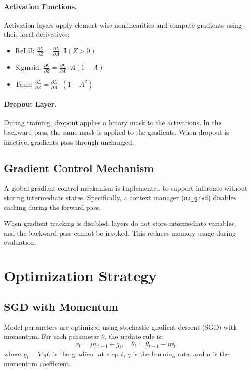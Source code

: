 \documentclass[11pt]{article}
\begin{document}
\paragraph{Activation Functions.}
Activation layers apply element-wise nonlinearities and compute gradients using their local derivatives:
\begin{itemize}
    \item ReLU: $\frac{\partial L}{\partial Z} = \frac{\partial L}{\partial A} \cdot \mathbf{I}(Z > 0)$
    \item Sigmoid: $\frac{\partial L}{\partial Z} = \frac{\partial L}{\partial A} \cdot A(1 - A)$
    \item Tanh: $\frac{\partial L}{\partial Z} = \frac{\partial L}{\partial A} \cdot (1 - A^2)$
\end{itemize}

\paragraph{Dropout Layer.}
During training, dropout applies a binary mask to the activations. In the backward pass, the same mask is applied to the gradients. When dropout is inactive, gradients pass through unchanged.

\subsection{Gradient Control Mechanism}

A global gradient control mechanism is implemented to support inference without storing intermediate states. Specifically, a context manager (\texttt{no\_grad}) disables caching during the forward pass.

When gradient tracking is disabled, layers do not store intermediate variables, and the backward pass cannot be invoked. This reduces memory usage during evaluation.

\section{Optimization Strategy}

\subsection{SGD with Momentum}

Model parameters are optimized using stochastic gradient descent (SGD) with momentum. For each parameter $\theta$, the update rule is:
\[
v_t = \mu v_{t-1} + g_t, \quad
\theta_t = \theta_{t-1} - \eta v_t
\]
where $g_t = \nabla_{\theta} L$ is the gradient at step $t$, $\eta$ is the learning rate, and $\mu$ is the momentum coefficient.
\end{document}
